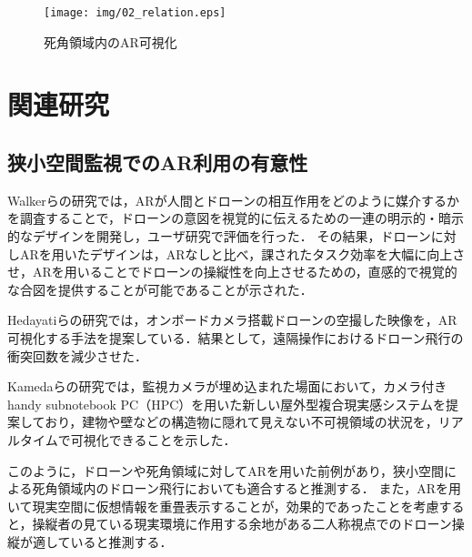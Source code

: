 \documentclass[submit]{ipsj}
\begin{document}

\begin{figure}[tb]
  \centering
  \texttt{[image: img/02\_relation.eps]}
  \caption{死角領域内のAR可視化}
  \label{fig:02_relation}
  \end{figure}
  

\section{関連研究}
\subsection{狭小空間監視でのAR利用の有意性}
Walkerらの研究\cite{book-ar01}では，ARが人間とドローンの相互作用をどのように媒介するかを調査することで，ドローンの意図を視覚的に伝えるための一連の明示的・暗示的なデザインを開発し，ユーザ研究で評価を行った．
その結果，ドローンに対しARを用いたデザインは，ARなしと比べ，課されたタスク効率を大幅に向上させ，ARを用いることでドローンの操縦性を向上させるための，直感的で視覚的な合図を提供することが可能であることが示された．

Hedayatiらの研究\cite{book-ar02}では，オンボードカメラ搭載ドローンの空撮した映像を，AR可視化する手法を提案している．結果として，遠隔操作におけるドローン飛行の衝突回数を減少させた．

Kamedaらの研究\cite{book-ar03}では，監視カメラが埋め込まれた場面において，カメラ付きhandy subnotebook PC（HPC）を用いた新しい屋外型複合現実感システムを提案しており，建物や壁などの構造物に隠れて見えない不可視領域の状況を，リアルタイムで可視化できることを示した．

このように，ドローンや死角領域に対してARを用いた前例があり，狭小空間による死角領域内のドローン飛行においても適合すると推測する．
また，ARを用いて現実空間に仮想情報を重畳表示することが，効果的であったことを考慮すると，操縦者の見ている現実環境に作用する余地がある二人称視点でのドローン操縦が適していると推測する．
\end{document}
